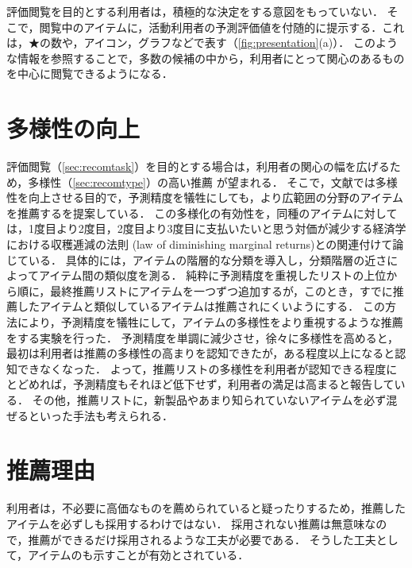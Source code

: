 評価閲覧を目的とする利用者は，積極的な決定をする意図をもっていない．
そこで，閲覧中のアイテムに，活動利用者の予測評価値を付随的に提示する．これは，★の数や，アイコン，グラフなどで表す（\ref{fig:presentation}(a)）．
このような情報を参照することで，多数の候補の中から，利用者にとって関心のあるものを中心に閲覧できるようになる．


\section{多様性の向上}
\label{sec:serendipity}

評価閲覧（\ref{sec:recomtask}）を目的とする場合は，利用者の関心の幅を広げるため，多様性（\ref{sec:recomtype}）の高い推薦
が望まれる．
そこで，文献\cite{www:05:01}では多様性を向上させる目的で，予測精度を犠牲にしても，より広範囲の分野のアイテムを推薦するを提案している．
この多様化の有効性を，同種のアイテムに対しては，1度目より2度目，2度目より3度目に支払いたいと思う対価が減少する経済学における収穫逓減の法則 (law of diminishing marginal returns)との関連付けて論じている．
具体的には，アイテムの階層的な分類を導入し，分類階層の近さによってアイテム間の類似度を測る．
純粋に予測精度を重視したリストの上位から順に，最終推薦リストにアイテムを一つずつ追加するが，このとき，すでに推薦したアイテムと類似しているアイテムは推薦されにくいようにする．
この方法により，予測精度を犠牲にして，アイテムの多様性をより重視するような推薦をする実験を行った．
予測精度を単調に減少させ，徐々に多様性を高めると，最初は利用者は推薦の多様性の高まりを認知できたが，ある程度以上になると認知できなくなった．
よって，推薦リストの多様性を利用者が認知できる程度にとどめれば，予測精度もそれほど低下せず，利用者の満足は高まると報告している．
その他，推薦リストに，新製品やあまり知られていないアイテムを必ず混ぜるといった手法も考えられる\cite{sigir:01:01}．

\section{推薦理由}
\label{sec:explanation}

利用者は，不必要に高価なものを薦められていると疑ったりするため，推薦したアイテムを必ずしも採用するわけではない．
採用されない推薦は無意味なので，推薦ができるだけ採用されるような工夫が必要である．
そうした工夫として，アイテムのも示すことが有効とされている．

